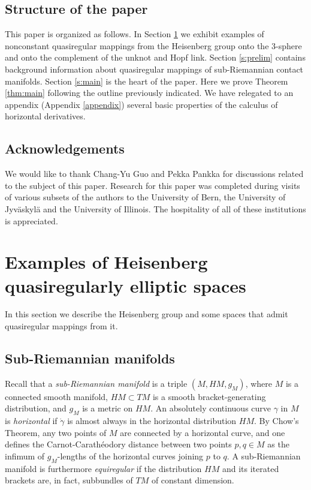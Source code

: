 \documentclass[10pt,letterpaper]{amsart}
\theoremstyle{definition}
\numberwithin{thm}{subsection}
\numberwithin{equation}{section}
\begin{document}
\subsection*{Structure of the paper}
This paper is organized as follows. In Section \ref{s:context-and-examples} we exhibit examples of nonconstant quasiregular mappings from the Heisenberg group onto the $3$-sphere and onto the complement of the unknot and Hopf link. Section \ref{s:prelim} contains background information about quasiregular mappings of sub-Riemannian contact manifolds. Section \ref{s:main}
is the heart of the paper. Here we prove Theorem \ref{thm:main} following the outline previously indicated.
We have relegated to an appendix (Appendix \ref{appendix}) several
basic properties of the calculus of horizontal derivatives.

\subsection*{Acknowledgements} We would like to thank Chang-Yu Guo and Pekka Pankka for discussions related to the subject of this paper. Research for this paper was completed during visits of various subsets of the authors to the University of Bern, the University of Jyv\"askyl\"a and the University of Illinois. The hospitality of all of these institutions is appreciated.

\section{Examples of Heisenberg quasiregularly elliptic spaces}\label{s:context-and-examples}
In this section we describe the Heisenberg group and some spaces
that admit quasiregular mappings from it.

\subsection{Sub-Riemannian manifolds}\label{ss:SRmfds}

Recall that a \emph{sub-Riemannian manifold} is a triple $(M,HM,g_M)$, where $M$ is a connected smooth manifold, $HM\subset TM$ is a smooth bracket-generating distribution, and $g_M$ is a
metric on $HM$. An absolutely continuous curve $\gamma$ in $M$ is \emph{horizontal} if $\dot \gamma$ is almost always in the horizontal distribution $HM$. By Chow's Theorem, any two points of $M$ are connected by a horizontal curve, and one defines the Carnot-Carath\'eodory distance between two points $p, q\in M$ as the infimum of $g_M$-lengths of the horizontal curves joining $p$ to $q$. A sub-Riemannian manifold is furthermore \emph{equiregular} if the distribution $HM$ and its iterated brackets are, in fact, subbundles of $TM$ of constant dimension.
\end{document}

